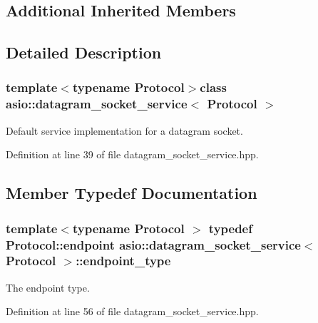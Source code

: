 \subsection*{Additional Inherited Members}


\subsection{Detailed Description}
\subsubsection*{template$<$typename Protocol$>$class asio\+::datagram\+\_\+socket\+\_\+service$<$ Protocol $>$}

Default service implementation for a datagram socket. 

Definition at line 39 of file datagram\+\_\+socket\+\_\+service.\+hpp.



\subsection{Member Typedef Documentation}
\hypertarget{classasio_1_1datagram__socket__service_a135b71c44f1e92b67cea4402f46578a9}{}
\subsubsection[{endpoint\+\_\+type}]{\setlength{\rightskip}{0pt plus 5cm}template$<$typename Protocol $>$ typedef Protocol\+::endpoint {\bf asio\+::datagram\+\_\+socket\+\_\+service}$<$ Protocol $>$\+::{\bf endpoint\+\_\+type}}\label{classasio_1_1datagram__socket__service_a135b71c44f1e92b67cea4402f46578a9}


The endpoint type. 



Definition at line 56 of file datagram\+\_\+socket\+\_\+service.\+hpp.

\hypertarget{classasio_1_1datagram__socket__service_a41dcdc6b8a3500d6f88e10b6c08925cd}{}
